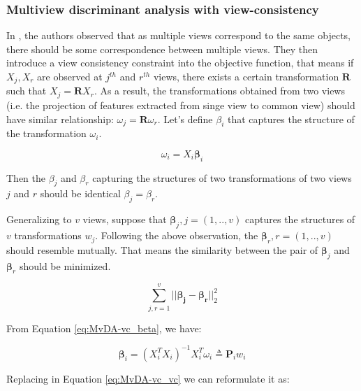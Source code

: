     \subsubsection{Multiview discriminant analysis with view-consistency}

        In \cite{kan2016multi}, the authors observed that as multiple views correspond to the same objects, there should be some correspondence between multiple views.
        They then introduce a view consistency constraint into the objective function, that means if $X_j, X_r$ are observed at $j^{th}$ and $r^{th}$ views, there exists a certain transformation $\boldsymbol{R}$ such that $X_j = \boldsymbol{R}X_r$.
        As a result, the transformations obtained from two views (i.e. the projection of features extracted from singe view to common view) should have similar relationship: ${\omega}_j = \boldsymbol{R}{\omega}_r$.
        Let's define $\beta_i$ that captures the structure of the transformation ${\omega}_i$.

        \begin{equation}
            \omega_i = X_i\boldsymbol\beta_i
            \label{eq:MvDA-vc_beta}
        \end{equation}

        Then the $\beta_j$ and $\beta_r$ capturing the structures of two transformations of two views $j$ and $r$ should be identical ${\beta}_j = {\beta}_r$.

        Generalizing to $v$ views, suppose that ${\boldsymbol\beta}_j, j=(1,..,v)$ captures the structures of $v$ transformations ${w}_j$.
        Following the above observation, the $\boldsymbol{\beta}_r, r=(1,..,v)$ should resemble mutually.
        That means the similarity between the pair of $\boldsymbol{\beta}_j$ and $\boldsymbol{\beta}_r$ should be minimized. 

        \begin{equation}
            \sum_{j,r=1}^{v}||\boldsymbol{\beta_j} - \boldsymbol{\beta_r}||_2^2
            \label{eq:MvDA-vc_vc}
        \end{equation}

        From Equation \eqref{eq:MvDA-vc_beta}, we have:

        \begin{equation}
            \boldsymbol\beta_i = {\left(X_i^{T}X_i\right)}^{-1}X_i^{T}\omega_i \triangleq \boldsymbol{P}_iw_i
        \end{equation}

        Replacing in Equation \eqref{eq:MvDA-vc_vc} we can reformulate it as:

